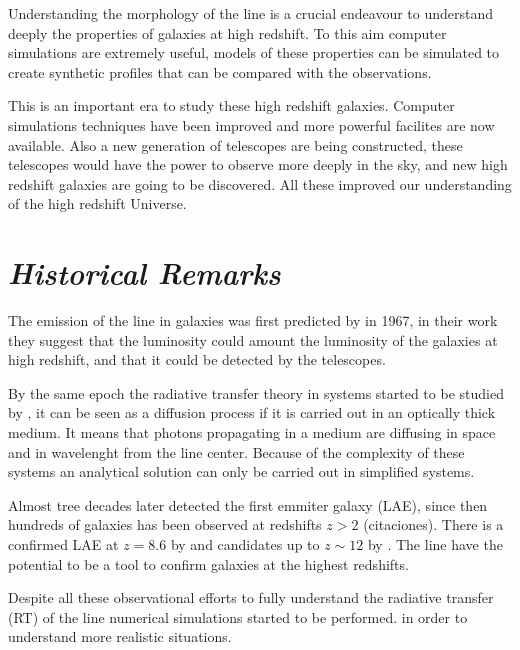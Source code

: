 Understanding the morphology of the \ly line is a crucial endeavour 
to understand deeply the properties of galaxies at high redshift. To this aim 
computer simulations are extremely useful, models of these properties 
can be simulated to create synthetic profiles that can be compared
with the observations. 

This is an important era to study these high redshift galaxies. Computer 
simulations techniques have been improved and more powerful facilites are
now available. Also a new generation of telescopes are being constructed,
these telescopes would have the power to observe more deeply in the sky, 
and new high redshift galaxies are going to be discovered. All these  
improved our understanding of the high redshift Universe. 



\section{\emph{Historical Remarks}}

The emission of the \ly line in galaxies was first predicted by 
\citep{PartridgePeebles} in 1967, in their work they suggest that the \ly luminosity
could amount the luminosity of the galaxies at high redshift, and that 
it could be detected by the telescopes. 

By the same epoch the radiative transfer theory in \ly systems started to be
 studied by \citep{Osterbrock62, Adams72, Harrington73, Neufeld90},
 it can be seen as a diffusion process if it is carried out in 
 an optically thick medium. It means that \ly photons propagating 
in a medium are diffusing in space and in wavelenght from the line center.   
Because of the complexity of these systems an analytical solution 
can only be carried out in simplified systems. 


Almost tree decades later \citep{DjorgovskiThomson92} detected the first \ly 
emmiter galaxy (LAE), since then hundreds of galaxies has been  
observed at redshifts $z>2$ (citaciones). There is a confirmed LAE at $z=8.6$ 
by \citep{Lenhert2010} and candidates up to $z\sim12$ by \citep{Brammer13}. 
The \ly line have the potential to be a tool to confirm galaxies at the highest 
redshifts. 

Despite all these observational efforts to fully understand the radiative
transfer (RT) of the \ly line numerical simulations started to be performed.
\citep{DijkstraKramer, Laursen09, Verhamme06, CLARA}
in order to understand more realistic situations.

